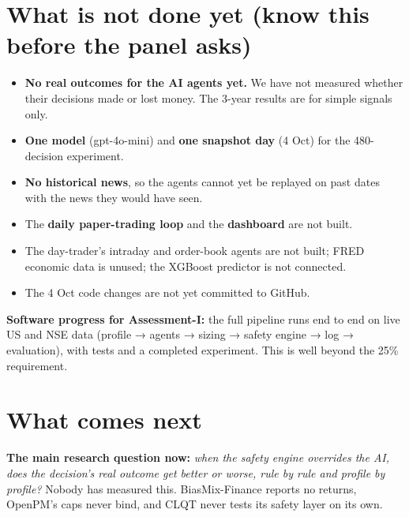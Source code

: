 \documentclass[10.5pt,a4paper]{article}
\begin{document}
\section{What is not done yet (know this before the panel asks)}

\begin{itemize}
\item \textbf{No real outcomes for the AI agents yet.} We have not measured whether their decisions made or lost money. The 3-year results are for simple signals only.
\item \textbf{One model} (gpt-4o-mini) and \textbf{one snapshot day} (4 Oct) for the 480-decision experiment.
\item \textbf{No historical news}, so the agents cannot yet be replayed on past dates with the news they would have seen.
\item The \textbf{daily paper-trading loop} and the \textbf{dashboard} are not built.
\item The day-trader's intraday and order-book agents are not built; FRED economic data is unused; the XGBoost predictor is not connected.
\item The 4 Oct code changes are not yet committed to GitHub.
\end{itemize}

\begin{okbox}
\textbf{Software progress for Assessment-I:} the full pipeline runs end to end on live US and NSE data (profile → agents → sizing → safety engine → log → evaluation), with tests and a completed experiment. This is well beyond the 25\% requirement.
\end{okbox}

\section{What comes next}

\textbf{The main research question now:} \emph{when the safety engine overrides the AI, does the decision's real outcome get better or worse, rule by rule and profile by profile?} Nobody has measured this. BiasMix-Finance reports no returns, OpenPM's caps never bind, and CLQT never tests its safety layer on its own.
\end{document}
